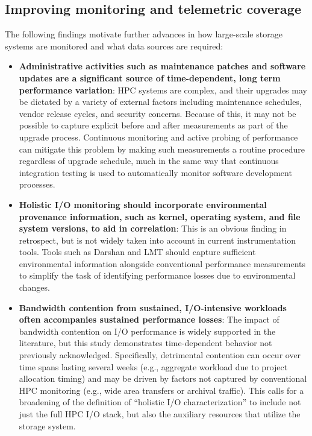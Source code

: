 \subsection{Improving monitoring and telemetric coverage}

The following findings motivate further advances in how large-scale storage systems are monitored and what data sources are required:


\begin{itemize}[leftmargin=*]

\item \textbf{Administrative activities such as maintenance patches and
software updates are a significant source of time-dependent, long term
performance variation}: HPC systems are complex, and their upgrades may be
dictated by a variety of external factors including maintenance schedules,
vendor release cycles, and security concerns.  Because of this, it may not be
possible to capture explicit before and after measurements as part of the
upgrade process.  Continuous monitoring and active probing of performance
can mitigate this problem by making such measurements a routine procedure regardless of upgrade
schedule, much in the same way that continuous integration testing is used
to automatically monitor software development processes.

\item \textbf{Holistic I/O monitoring should incorporate environmental
provenance information, such as kernel, operating system, and file system
versions, to aid in correlation}: 
This is an obvious finding in retrospect, but is not widely taken into
account in current instrumentation tools.  Tools such as Darshan and
LMT should capture sufficient environmental information 
alongside conventional performance measurements to
simplify the task of identifying performance losses due to environmental changes.

\item \textbf{Bandwidth contention from sustained, I/O-intensive workloads often accompanies
sustained performance losses}: The impact of bandwidth contention on I/O
performance is widely supported in the literature, but this study demonstrates
time-dependent behavior not previously acknowledged. Specifically, detrimental contention
can occur over time spans lasting several weeks (e.g., aggregate
workload due to project allocation timing) and may be driven by factors 
not captured by conventional HPC monitoring (e.g., wide area transfers or 
archival traffic).  This calls for a broadening of the definition of
``holistic I/O characterization'' to include not just the full HPC I/O
stack, but also the auxiliary resources that utilize the storage system.

\end{itemize}


